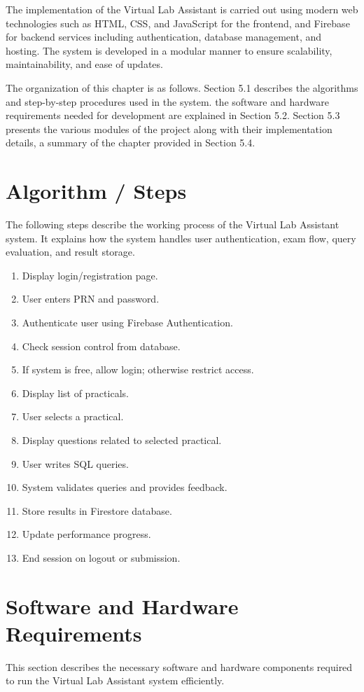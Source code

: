 \documentclass{SSBT-BE}
\begin{document}
The implementation of the Virtual Lab Assistant is carried out using modern web technologies such as HTML, CSS, and JavaScript for the frontend, and Firebase for backend services including authentication, database management, and hosting. The system is developed in a modular manner to ensure scalability, maintainability, and ease of updates.


The organization of this chapter is as follows. Section 5.1 describes the algorithms
and step-by-step procedures used in the system. the software
and hardware requirements needed for development are explained in Section 5.2. Section 5.3 presents the various
modules of the project along with their implementation details, a summary of the chapter provided in Section 5.4.


\section{Algorithm / Steps}
The following steps describe the working process of the Virtual Lab Assistant system. 
It explains how the system handles user authentication, exam flow, query evaluation, and result storage.

\begin{enumerate}

\item Display login/registration page.
\item User enters PRN and password.
\item Authenticate user using Firebase Authentication.
\item Check session control from database.
\item If system is free, allow login; otherwise restrict access.
\item Display list of practicals.
\item User selects a practical.
\item Display questions related to selected practical.
\item User writes SQL queries.
\item System validates queries and provides feedback.
\item Store results in Firestore database.
\item Update performance progress.
\item End session on logout or submission.
\end{enumerate}


\section{Software and Hardware Requirements}
This section describes the necessary software and hardware components required to run the Virtual Lab Assistant system efficiently.
\end{document}
